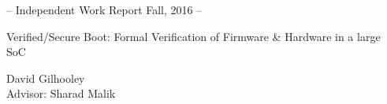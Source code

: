 \documentclass[../report.tex]{subfiles}
\begin{document}
\begin{center}
    \small{-- Independent Work Report Fall, 2016 --}
\end{center}

\vspace{1in}

\begin{center}
    \huge{Verified/Secure Boot: Formal Verification of Firmware \& Hardware in a large SoC} \\
\end{center}

\vspace{1in}

\begin{center}
    \Large{David Gilhooley} \\
    \vspace{0.1in}
    \large{Advisor: Sharad Malik} \\
\end{center}

\vspace{1in}


\thispagestyle{empty}

\newpage
\tableofcontents
\newpage
\end{document}

